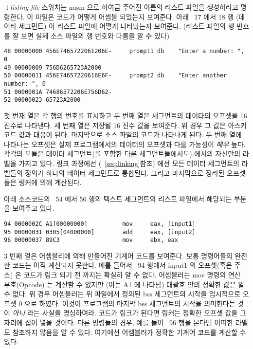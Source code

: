 {\code -l {\em listing-file}} 스위치는 {\code nasm} 으로 하여금 주어진 이름의 리스트 파일을 생성하라고 명령한다. 
이 파일은 코드가 어떻게 어셈블 되었는지 보여준다.
아래 ~17 에서 18 행 (데이타 세그먼트) 이 리스트 파일에 어떻게 나타났는지 보여준다. (리스트 파일의 행 번호를 잘 보면 실제 소스 파일의 행 번호와 다름을 
알 수 있다) 

\begin{Verbatim}[xleftmargin=\AsmMargin]
48 00000000 456E7465722061206E-     prompt1 db    "Enter a number: ", 0
49 00000009 756D6265723A2000
50 00000011 456E74657220616E6F-     prompt2 db    "Enter another number: ", 0
51 0000001A 74686572206E756D62-
52 00000023 65723A2000
 \end{Verbatim}
 첫 번재 열은 각 행의 번호를 표시하고 두 번째 열은 세그먼트의 데이타의 오프셋을 16 진수로 나타낸다. 세 번째 열은 저장될 16 진수 값을 보여준다. 위 경우 그 값은
 아스키코드 값과 대응이 된다. 마지막으로 소스 파일의 코드가 나타나게 된다. 두 번째 열에 나타나는 오프셋은 실제 프로그램에서의 데이터의 오프셋과 다를
 가능성이 \emph{매우} 높다. 각각의 모듈은 데이터 세그먼트(를 포함한 다른 세그먼트들에서도) 에서의 자신만의 라벨을 가지고 있다.  링크 과정에선 
 (~\ref{seq:linking}참조) 에선 모든 데이터 세그먼트의 라벨들의 정의가 하나의 데이터 세그먼트로 통합된다. 그리고 마지막으로 정리된 오프셋들은 링커에 의해 
 계산된다. 

아래 소스코드의 ~54 에서 56 행의 텍스트 세그먼트의 리스트 파일에서 해당되는 부분을 보여주고 있다. 

\begin{Verbatim}[xleftmargin=\AsmMargin]
94 0000002C A1[00000000]          mov     eax, [input1]
95 00000031 0305[04000000]        add     eax, [input2]
96 00000037 89C3                  mov     ebx, eax
\end{Verbatim}
3 번째 열은 어셈블리에 의해 만들어진 기계어 코드를 보여준다. 보통 명령어들의 완전한 코드는 아직 계산되지 못한다. 예를 들어서 ~94 행에서 {\code input1} 의
오프셋(혹은 주소) 은 코드가 링크 되기 전 까지는 확실히 알 수 없다. 어셈블러는 {\code mov} 명령의 연산 부호(Opcode) 는 계산할 수 있지만 (이는 A1 에 
나타남) 대괄호 안의 정확한 값은 알 수 없다. 위 경우 어셈블러는 위 파일에서 정의된 bss 세그먼트의 시작을 임시적으로 오프셋 0 으로 하였다. 이것이
프로그램의 마지막 bss 세그먼트의 시작을 의미한다는 것이 \emph{아니} 라는 사실을 명심하여라. 코드가 링크가 된다면 링커는 정확한 오프셋 값을 그 자리에
집어 넣을 것이다. 다른 명령들의 경우, 예를 들어 ~96 행을 본다면 어떠한 라벨도 참조하지 않음을 알 수 있다. 여기에선 어셈블러가 정확한 기계어 코드를 
계산할 수 있다. 

